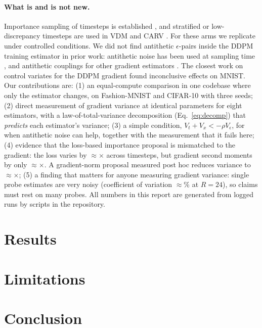 \documentclass[10pt]{article}
\begin{document}
\paragraph{What is and is not new.} Importance sampling of timesteps is established
\citep{nichol2021improved,song2021mle,kim2025adaptive,sun2026variance}, and stratified or low-discrepancy
timesteps are used in VDM \citep{kingma2021vdm} and CARV \citep{carv2026}. For these arms we replicate under
controlled conditions. We did not find antithetic $\epsilon$-pairs inside the DDPM training estimator in
prior work: antithetic noise has been used at sampling time \citep{antithetic2026}, and antithetic couplings for
other gradient estimators \citep{ren2019antithetic}. The closest work on control variates for the DDPM gradient
\citep{jeha2024taylor} found inconclusive effects on MNIST. Our contributions are:
(1) an equal-compute comparison in one codebase where only the estimator changes, on Fashion-MNIST and CIFAR-10
with three seeds;
(2) direct measurement of gradient variance at identical parameters for eight estimators, with a law-of-total-variance
decomposition (Eq.~\ref{eq:decomp}) that \emph{predicts} each estimator's variance;
(3) a simple condition, $V_t+V_x<-\rho V_\epsilon$, for when antithetic noise can help, together with the
measurement that it fails here;
(4) evidence that the loss-based importance proposal is mismatched to the gradient: the loss varies by
$\approx$\LossRange$\times$ across timesteps, but gradient second moments by only $\approx$\GradRange$\times$. A
gradient-norm proposal measured post hoc reduces variance to $\approx$\PHOracle$\times$;
(5) a finding that matters for anyone measuring gradient variance: single probe estimates are very noisy
(coefficient of variation $\approx$\PHcv\% at $R=24$), so claims must rest on many probes.
All numbers in this report are generated from logged runs by scripts in the repository.




\section{Results}
\label{sec:results}


\section{Limitations}
\label{sec:limitations}


\section{Conclusion}





\appendix

\end{document}
